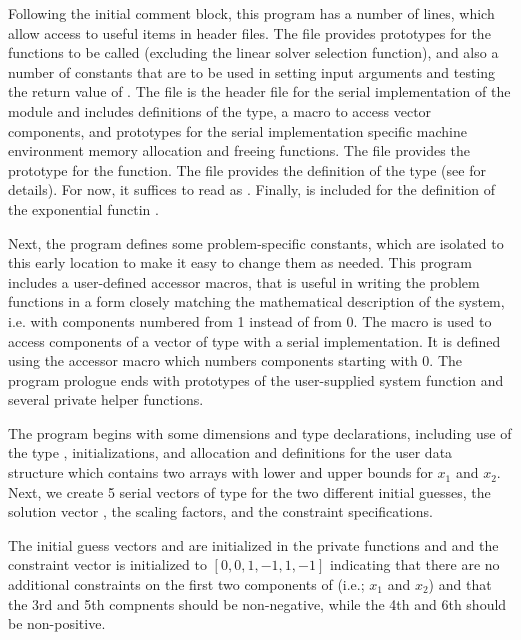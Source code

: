 Following the initial comment block, this program has a number
of  lines, which allow access to useful items in {\cvode}
header files. 
The  file provides prototypes for the {\kinsol}
functions to be called (excluding the linear solver selection
function), and also a number of constants that are to be used in
setting input arguments and testing the return value of .
The  file is the header file for the serial
implementation of the {\nvector} module and includes definitions of the 
 type, a macro to access vector components, and prototypes 
for the serial implementation specific machine environment memory allocation
and freeing functions.
The  file provides the prototype for the  function.
The  file provides the definition of the
type  (see  for details).  
For now, it suffices to read  as .
Finally,  is included for the definition of the
exponential functin .

Next, the program defines some problem-specific constants, which are
isolated to this early location to make it easy to change them as needed.  
This program includes a user-defined accessor macros,  that
is useful in writing the problem functions in a form closely matching 
the mathematical description of the system, i.e. with components numbered 
from 1 instead of from 0. The  macro is used to access components 
of a vector of type  with a serial implementation.  
It is defined using the {\nvecs} accessor macro  which 
numbers components starting with 0.
The program prologue ends with prototypes of the user-supplied system function 
 and several private helper functions.

The  program begins with some dimensions and type declarations,
including use of the type , initializations, and allocation
and definitions for the user data structure  which contains two
arrays with lower and upper bounds for $x_1$ and $x_2$. Next, we create 5
serial vectors of type  for the two different initial guesses,
the solution vector , the scaling factors, and the constraint specifications.

The initial guess vectors  and  are initialized in the private
functions  and  and the constraint
vector  is initialized to $[0,0,1,-1,1,-1]$ indicating that there are
no additional constraints on the first two components of  (i.e.; $x_1$ and 
$x_2$) and that the 3rd and 5th compnents should be non-negative, while
the 4th and 6th should be non-positive.

